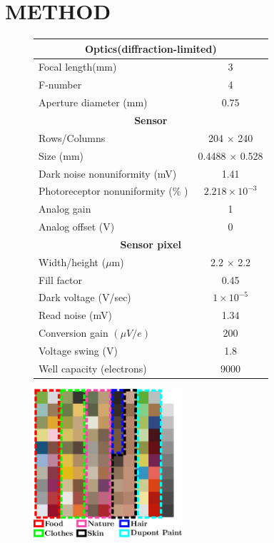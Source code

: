 \documentclass[]{spie}
\begin{document}
\section{METHOD}

\begin{figure}[t]
 \begin{center}
\begin{minipage}{0.45\textwidth}
\begin{flushright}
 \begin{scriptsize}
\begin{tabular}{|l|c|}
\hline 
\multicolumn{2}{|c|}{\textbf{Optics(diffraction-limited)}} \\\hline 
Focal length(mm) & 3 \\ 
F-number & 4 \\ 
Aperture diameter (mm) & 0.75 \\ \hline 
\multicolumn{2}{|c|}{\textbf{Sensor}} \\ \hline 
Rows/Columns & 204 $\times$ 240 \\ 
Size (mm) & 0.4488 $\times$ 0.528 \\ 
Dark noise nonuniformity (mV) & 1.41 \\ 
Photoreceptor nonuniformity (\% ) & $2.218 \times 10 ^{-3}$ \\ 
Analog gain & 1 \\ 
Analog offset (V) & 0 \\\hline 
\multicolumn{2}{|c|}{\textbf{Sensor pixel }} \\ \hline 
Width/height ($\mu$m) & 2.2 $\times$ 2.2\\ 
Fill factor & 0.45 \\
Dark voltage (V/sec) & $1 \times 10^{-5}$ \\ 
Read noise (mV) & 1.34 \\ 
Conversion gain $(\mu V/e)$ & 200 \\ 
Voltage swing (V) & 1.8 \\ 
Well capacity (electrons) & 9000 \\ \hline 
\end{tabular} 
\end{scriptsize}
\end{flushright}
\end{minipage}\hfill
\begin{minipage}{0.45\textwidth}
\begin{flushleft}
 \includegraphics[height=5.5cm]{Fig2/chart}

\end{flushleft}
\end{minipage}
\end{center}
\end{figure}
\end{document}

